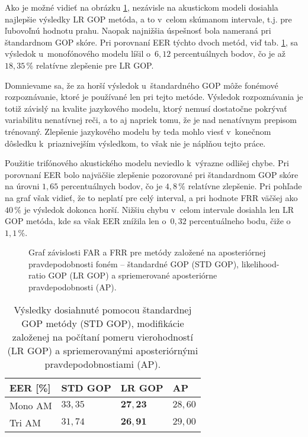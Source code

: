 Ako je možné vidieť na obrázku \ref{fig:roc-gop-methods}, nezávisle na akustickom modeli dosiahla najlepšie výsledky LR GOP metóda, a to v~celom skúmanom intervale, t.j. pre ľubovoľnú hodnotu prahu. Naopak najnižšia úspešnosť bola nameraná pri štandardnom GOP skóre. Pri porovnaní EER týchto dvoch metód, viď tab. \ref{tab:eer-gop-methods}, sa výsledok u~monofónového modelu líšil o~$6{,}12$ percentuálnych bodov, čo je až $18{,}35\,\%$ relatívne zlepšenie pre LR GOP. 

Domnievame sa, že za horší výsledok u~štandardného GOP môže fonémové rozpoznávanie, ktoré je používané len pri tejto metóde. Výsledok rozpoznávania je totiž závislý na kvalite jazykového modelu, ktorý nemusí dostatočne pokrývať variabilitu nenatívnej reči, a to aj napriek tomu, že je nad nenatívnym prepisom trénovaný. Zlepšenie jazykového modelu by teda mohlo viesť v~konečnom dôsledku k~priaznivejším výsledkom, to však nie je náplňou tejto práce.

Použitie trifónového akustického modelu neviedlo k~výrazne odlišej chybe. Pri porovnaní EER bolo najväčšie zlepšenie pozorované pri štandardnom GOP skóre na úrovni $1{,}65$ percentuálnych bodov, čo je $4{,}8\,\%$ relatívne zlepšenie. Pri pohľade na graf však vidieť, že to neplatí pre celý interval, a pri hodnote FRR väčšej ako $40\,\%$ je výsledok dokonca horší. Nižšiu chybu v~celom intervale dosiahla len LR GOP metóda, kde sa však EER znížila len o~$0{,}32$ percentuálneho bodu, čiže o~$1{,}1\,\%$.

\begin{figure}[h!]
    \centering
    
    \caption{Graf závislosti FAR a FRR pre metódy založené na aposteriórnej pravdepodobnosti foném -- štandardné GOP (STD GOP), likelihood-ratio GOP (LR GOP) a spriemerované aposteriórne pravdepodobnosti (AP).} \label{fig:roc-gop-methods}
\end{figure}

\begin{table}[h!]
\centering
\begin{tabular}{@{}llll@{}}
\toprule
EER {[}\%{]} & STD GOP & LR GOP  & AP \\ \midrule
Mono AM      & $33{,}35$   & $\bm{27{,}23}$   & $28{,}60$  \\
Tri AM       & $31{,}74$   & $\bm{26{,}91}$   & $29{,}00$  \\ \bottomrule
\end{tabular}
\caption{Výsledky dosiahnuté pomocou štandardnej GOP metódy (STD GOP), modifikácie založenej na počítaní pomeru vierohodností (LR GOP) a spriemerovanými aposteriórnými pravdepodobnostiami (AP).} \label{tab:eer-gop-methods}
\end{table} 

